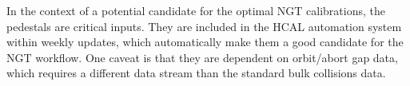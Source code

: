 In the context of a potential candidate for the optimal NGT calibrations, the pedestals are critical inputs. They are included in the HCAL automation system within weekly updates, which automatically make them a good candidate for the NGT workflow. One caveat is that they are dependent on orbit/abort gap data, which requires a different data stream than the standard bulk collisions data.



